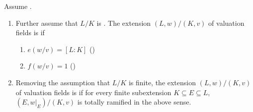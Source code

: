 \begin{definition} \label{definition:totally_ramified_extension_of_valuation_fields}
    Assume . 
    \begin{enumerate}
        \item Further assume that $L/K$ is . The extension $(L,w)/(K,v)$ of valuation fields is  if 
        \begin{enumerate}
            \item $e(w/v) = [L:K]$ ()
            \item $f(w/v) = 1$ ()
        \end{enumerate}

        \item Removing the assumption that $L/K$ is finite, the extension $(L,w)/(K,v)$ of valuation fields is  if for every finite subextension $K \subseteq E \subseteq L$, $(E, w|_E) /(K,v)$ is totally ramified in the above sense.
    \end{enumerate}
\end{definition}